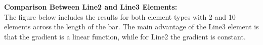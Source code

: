 \textbf{Comparison Between Line2 and Line3 Elements:}\\
The figure below includes the results for both element types with 2 and 10 elements across the length of the bar. The main advantage of the Line3 element is that the gradient is a linear function, while for Line2 the gradient is constant.
\begin{figure}[ht!]
 \\
\end{figure}





